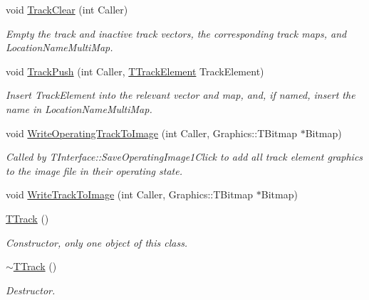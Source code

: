 \begin{DoxyCompactItemize}
void \mbox{\hyperlink{class_t_track_ae6fe537bbd1e56074a358bf2c6233c71}{Track\+Clear}} (int Caller)
\begin{DoxyCompactList}\small\item\em Empty the track and inactive track vectors, the corresponding track maps, and Location\+Name\+Multi\+Map. \end{DoxyCompactList}\item 
\mbox{\label{class_t_track_a2d8f9445f873689b8e71d3f8efc7c7d3}} 
void \mbox{\hyperlink{class_t_track_a2d8f9445f873689b8e71d3f8efc7c7d3}{Track\+Push}} (int Caller, \mbox{\hyperlink{class_t_track_element}{T\+Track\+Element}} Track\+Element)
\begin{DoxyCompactList}\small\item\em Insert Track\+Element into the relevant vector and map, and, if named, insert the name in Location\+Name\+Multi\+Map. \end{DoxyCompactList}\item 
\mbox{\label{class_t_track_afb6bf873ba2e4107cf462f9d42dbe33f}} 
void \mbox{\hyperlink{class_t_track_afb6bf873ba2e4107cf462f9d42dbe33f}{Write\+Operating\+Track\+To\+Image}} (int Caller, Graphics\+::\+T\+Bitmap $\ast$Bitmap)
\begin{DoxyCompactList}\small\item\em Called by T\+Interface\+::\+Save\+Operating\+Image1\+Click to add all track element graphics to the image file in their operating state. \end{DoxyCompactList}\item 
void \mbox{\hyperlink{class_t_track_ab3530b4af2a4b2a9cd1c1b480a19298d}{Write\+Track\+To\+Image}} (int Caller, Graphics\+::\+T\+Bitmap $\ast$Bitmap)
\item 
\mbox{\label{class_t_track_a2db41b793217546f23d218294c088996}} 
\mbox{\hyperlink{class_t_track_a2db41b793217546f23d218294c088996}{T\+Track}} ()
\begin{DoxyCompactList}\small\item\em Constructor, only one object of this class. \end{DoxyCompactList}\item 
\mbox{\label{class_t_track_aefdbe7fe9d1092aa9c543a0bb16c84a0}} 
\mbox{\hyperlink{class_t_track_aefdbe7fe9d1092aa9c543a0bb16c84a0}{$\sim$\+T\+Track}} ()
\begin{DoxyCompactList}\small\item\em Destructor. \end{DoxyCompactList}\end{DoxyCompactItemize}
